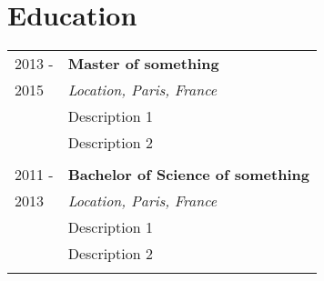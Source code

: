 \section{Education}
\begin{tabularx}{\textwidth}{l|X}

\textsc{2013 -}
&\textbf{Master of something}\\
\textsc{2015}
&\emph{Location, Paris, France}\\
&\footnotesize{Description 1}\\
&\footnotesize{Description 2}\\

\multicolumn{2}{c}{}\\

\textsc{2011 -}
&\textbf{Bachelor of Science of something}\\
\textsc{2013}
&\emph{Location, Paris, France}\\
&\footnotesize{Description 1}\\
&\footnotesize{Description 2}\\

\multicolumn{2}{c}{} \\
\end{tabularx}
